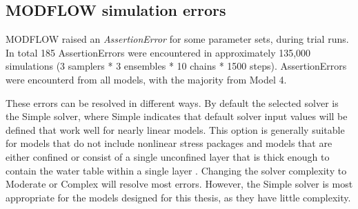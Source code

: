 \FloatBarrier
\subsection{MODFLOW simulation errors}\label{sim_error}
MODFLOW raised an \textit{AssertionError} for some parameter sets, during trial runs. In total 185 AssertionErrors were encountered in approximately 135,000 simulations (3 samplers * 3 ensembles * 10 chains * 1500 steps). AssertionErrors were encounterd from all models, with the majority from Model 4.  




These errors can be resolved in different ways. By default the selected solver is the Simple solver, where Simple indicates that default solver input values will be defined that work well for nearly linear models. This option is generally suitable for models that do not include nonlinear stress packages and models that are either confined or consist of a single unconfined layer that is thick enough to contain the water table within a single layer \citep{waterloo2024solver}. Changing the solver complexity to Moderate or Complex will resolve most errors. However, the Simple solver is most appropriate for the models designed for this thesis, as they have little complexity. 

